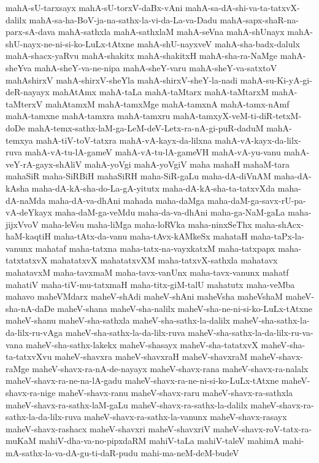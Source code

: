 {mahA-sU-tarxsayx
mahA-sU-torxV-daBx-vAni
mahA-sa-dA-shi-va-ta-tatxvX-dalilx
mahA-sa-ha-BoV-ja-na-sathx-la-vi-da-La-va-Dadu
mahA-sapx-shaR-na-parx-sA-dava
mahA-sathxla
mahA-sathxlaM
mahA-seVna
mahA-shUnayx
mahA-shU-nayx-ne-ni-si-ko-LuLx-tAtxne
mahA-shU-nayxveV
mahA-sha-badx-dalulx
mahA-shacx-yaRvu
mahA-shakitx
mahA-shakitxH
mahA-sha-ra-NaMge
mahA-sheYva
mahA-sheY-va-ne-nipa
mahA-sheY-varu
mahA-sheY-va-satxtoV
mahAshirxV
mahA-shirxV-sheYla
mahA-shirxV-sheY-la-nadi
mahA-su-Ki-yA-gi-deR-nayayx
mahAtAmx
mahA-taLa
mahA-taMtarx
mahA-taMtarxM
mahA-taMterxV
mahAtamxM
mahA-tamxMge
mahA-tamxnA
mahA-tamx-nAmf
mahA-tamxne
mahA-tamxra
mahA-tamxru
mahA-tamxyX-veM-ti-diR-tetxM-doDe
mahA-temx-sathx-laM-ga-LeM-deV-Letx-ra-nA-gi-puR-daduM
mahA-temxya
mahA-tiV-toV-tatxra
mahA-vA-kayx-da-lilxna
mahA-vA-kayx-da-lilx-ruva
mahA-vA-tu-lA-gameV
mahA-vA-tu-lA-gameVH
mahA-vA-yu-vanu
mahA-veY-rA-gayx-shAliV
mahA-yoVgi
mahA-yoVgiV
maha
mahaH
mahaM-tara
mahaSiR
maha-SiRBiH
mahaSiRH
maha-SiR-gaLu
maha-dA-diVnAM
maha-dA-kAsha
maha-dA-kA-sha-do-La-gA-yitutx
maha-dA-kA-sha-ta-tatxvXda
maha-dA-naMda
maha-dA-va-dhAni
mahada
maha-daMga
maha-daM-ga-savx-rU-pa-vA-deYkayx
maha-daM-ga-veMdu
maha-da-va-dhAni
maha-ga-NaM-gaLa
maha-jijxVvoV
maha-leVsu
maha-liMga
maha-loRVka
maha-ninxSeThx
maha-shAcx-haM-kaqtiH
maha-tAtx-da-vanu
maha-tAvx-kAMkeSx
mahataH
maha-taPx-la-vanunx
mahataf
maha-tatxna
maha-tatx-na-vayxkatxM
maha-tatxpapx
maha-tatxtatxvX
mahatatxvX
mahatatxvXM
maha-tatxvX-sathxla
mahatavx
mahatavxM
maha-tavxmaM
maha-tavx-vanUnx
maha-tavx-vanunx
mahatf
mahatiV
maha-tiV-mu-tatxmaH
maha-titx-giM-talU
mahatutx
maha-veMba
mahavo
maheVMdarx
maheV-shAdi
maheV-shAni
maheVsha
maheVshaM
maheV-sha-nA-daDe
maheV-shana
maheV-sha-nalilx
maheV-sha-ne-ni-si-ko-LuLx-tAtxne
maheV-shanu
maheV-sha-sathxla
maheV-sha-sathx-la-dalilx
maheV-sha-sathx-la-da-lilx-ru-vAga
maheV-sha-sathx-la-da-lilx-ruva
maheV-sha-sathx-la-da-lilx-ru-va-vana
maheV-sha-sathx-lakekx
maheV-shasayx
maheV-sha-tatatxvX
maheV-sha-ta-tatxvXvu
maheV-shavxra
maheV-shavxraH
maheV-shavxraM
maheV-shavx-raMge
maheV-shavx-ra-nA-de-nayayx
maheV-shavx-rana
maheV-shavx-ra-nalalx
maheV-shavx-ra-ne-na-lA-gadu
maheV-shavx-ra-ne-ni-si-ko-LuLx-tAtxne
maheV-shavx-ra-nige
maheV-shavx-ranu
maheV-shavx-raru
maheV-shavx-ra-sathxla
maheV-shavx-ra-sathx-laM-gaLu
maheV-shavx-ra-sathx-la-dalilx
maheV-shavx-ra-sathx-la-da-lilx-ruva
maheV-shavx-ra-sathx-la-vanunx
maheV-shavx-rasayx
maheV-shavx-rashacx
maheV-shavxri
maheV-shavxriV
maheV-shavx-roV-tatx-ra-muKaM
mahiV-dha-va-no-pipxdaRM
mahiV-taLa
mahiV-taleV
mahimA
mahi-mA-sathx-la-va-dA-gu-ti-daR-pudu
mahi-ma-neM-deM-budeV
}
